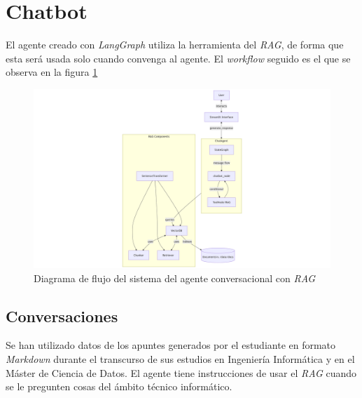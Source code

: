 \documentclass[12pt,letterpaper]{article}
\begin{document}
\section{Chatbot}
El agente creado con \textit{LangGraph} utiliza la herramienta del \textit{RAG}, de forma que esta será usada solo cuando convenga al agente. El \textit{workflow} seguido es el que se observa en la figura \ref{fig:flow}

\begin{figure}[htp]
    \centering
    \includegraphics[width=1\linewidth]{img/flow.png}
    \caption{Diagrama de flujo del sistema del agente conversacional con \textit{RAG}}
    \label{fig:flow}
\end{figure}

\subsection{Conversaciones}
Se han utilizado datos de los apuntes generados por el estudiante en formato \textit{Markdown} durante el transcurso de sus estudios en Ingeniería Informática y en el Máster de Ciencia de Datos. El agente tiene instrucciones de usar el \textit{RAG} cuando se le pregunten cosas del ámbito técnico informático.
\end{document}
